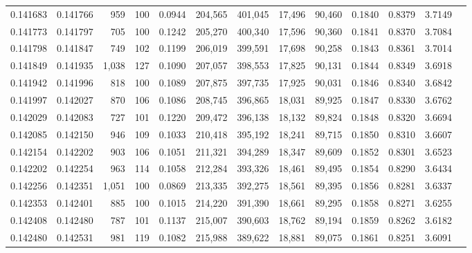 \begin{tabular}{rrrrrrrrrrrrr}
0.141683 & 0.141766 &   959 & 100 &                                     0.0944 & 204,565 & 401,045 &  17,496 &  90,460 & 0.1840 & 0.8379 & 3.7149 \\
0.141773 & 0.141797 &   705 & 100 &                                     0.1242 & 205,270 & 400,340 &  17,596 &  90,360 & 0.1841 & 0.8370 & 3.7084 \\
0.141798 & 0.141847 &   749 & 102 &                                     0.1199 & 206,019 & 399,591 &  17,698 &  90,258 & 0.1843 & 0.8361 & 3.7014 \\
0.141849 & 0.141935 & 1,038 & 127 &                                     0.1090 & 207,057 & 398,553 &  17,825 &  90,131 & 0.1844 & 0.8349 & 3.6918 \\
0.141942 & 0.141996 &   818 & 100 &                                     0.1089 & 207,875 & 397,735 &  17,925 &  90,031 & 0.1846 & 0.8340 & 3.6842 \\
0.141997 & 0.142027 &   870 & 106 &                                     0.1086 & 208,745 & 396,865 &  18,031 &  89,925 & 0.1847 & 0.8330 & 3.6762 \\
0.142029 & 0.142083 &   727 & 101 &                                     0.1220 & 209,472 & 396,138 &  18,132 &  89,824 & 0.1848 & 0.8320 & 3.6694 \\
0.142085 & 0.142150 &   946 & 109 &                                     0.1033 & 210,418 & 395,192 &  18,241 &  89,715 & 0.1850 & 0.8310 & 3.6607 \\
0.142154 & 0.142202 &   903 & 106 &                                     0.1051 & 211,321 & 394,289 &  18,347 &  89,609 & 0.1852 & 0.8301 & 3.6523 \\
0.142202 & 0.142254 &   963 & 114 &                                     0.1058 & 212,284 & 393,326 &  18,461 &  89,495 & 0.1854 & 0.8290 & 3.6434 \\
0.142256 & 0.142351 & 1,051 & 100 &                                     0.0869 & 213,335 & 392,275 &  18,561 &  89,395 & 0.1856 & 0.8281 & 3.6337 \\
0.142353 & 0.142401 &   885 & 100 &                                     0.1015 & 214,220 & 391,390 &  18,661 &  89,295 & 0.1858 & 0.8271 & 3.6255 \\
0.142408 & 0.142480 &   787 & 101 &                                     0.1137 & 215,007 & 390,603 &  18,762 &  89,194 & 0.1859 & 0.8262 & 3.6182 \\
0.142480 & 0.142531 &   981 & 119 &                                     0.1082 & 215,988 & 389,622 &  18,881 &  89,075 & 0.1861 & 0.8251 & 3.6091 \\

\end{tabular}
